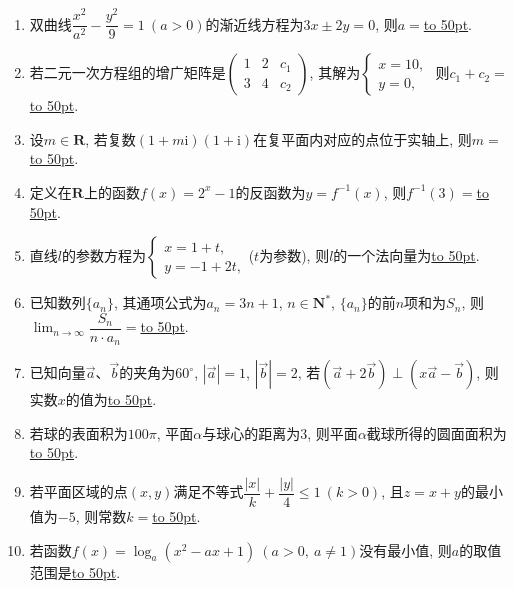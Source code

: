 \documentclass[10pt,a4paper]{article}
\newcommand{\blank}[1]{\underline{\hbox to #1pt{}}}
\begin{document}
\begin{enumerate}[1.]
\item 双曲线$\dfrac{x^2}{a^2}-\dfrac{y^2}9=1 \ (a>0)$的渐近线方程为$3x\pm 2y=0$, 则$a=$\blank{50}.
\item 若二元一次方程组的增广矩阵是$\begin{pmatrix} 1 & 2 & c_1  \\ 3 & 4 & c_2 \end{pmatrix}$, 其解为$\begin{cases} x=10, \\ y=0, \end{cases}$ 则$c_1+c_2=$\blank{50}.
\item 设$m\in \mathbf{R}$, 若复数$(1+m\mathrm{i})(1+\mathrm{i})$在复平面内对应的点位于实轴上, 则$m=$\blank{50}.
\item 定义在$\mathbf{R}$上的函数$f(x)=2^x-1$的反函数为$y=f^{-1}(x)$, 则$f^{-1}(3)=$\blank{50}.
\item 直线$l$的参数方程为$\begin{cases}  x=1+t, \\ y=-1+2t, \end{cases}$($t$为参数), 则$l$的一个法向量为\blank{50}.
\item 已知数列$\{a_n\}$, 其通项公式为$a_n=3n+1$, $n\in \mathbf{N}^*$, $\{a_n\}$的前$n$项和为$S_n$, 则$\displaystyle\lim_{n\to\infty}\dfrac{S_n}{n\cdot {a_n}}=$\blank{50}.
\item 已知向量$\overrightarrow a$、$\overrightarrow b$的夹角为$60^{\circ}$, $|\overrightarrow a|=1$, $|\overrightarrow b|=2$, 若$(\overrightarrow a+2 \overrightarrow b)\perp (x\overrightarrow a-\overrightarrow b)$, 则实数$x$的值为\blank{50}.
\item 若球的表面积为$100 \pi$, 平面$\alpha$与球心的距离为$3$, 则平面$\alpha$截球所得的圆面面积为\blank{50}.
\item 若平面区域的点$(x,y)$满足不等式$\dfrac{|x|}k+\dfrac{|y|}4\le 1\ (k>0)$, 且$z=x+y$的最小值为$-5$, 则常数$k=$\blank{50}.
\item 若函数$f(x)={\log_a}(x^2-ax+1)\ (a>0, \ a\ne 1)$没有最小值, 则$a$的取值范围是\blank{50}.



\end{enumerate}
\end{document}
